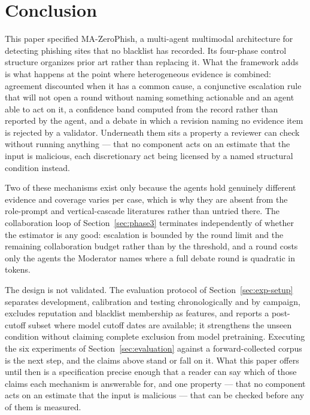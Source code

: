 \section{Conclusion}

This paper specified MA-ZeroPhish, a multi-agent multimodal architecture for
detecting phishing sites that no blacklist has recorded. Its four-phase control
structure organizes prior art rather than replacing it. What the framework adds
is what happens at the point where heterogeneous evidence is combined: agreement discounted when it
has a common cause, a conjunctive escalation rule that will not open a round
without naming something actionable and an agent able to act on it, a confidence
band computed from the record rather than reported by the agent, and a debate in
which a revision naming no evidence item is rejected by a validator. Underneath
them sits a property a reviewer can check without running anything --- that no
component acts on an estimate that the input is malicious, each discretionary
act being licensed by a named structural condition instead.

Two of these mechanisms exist only because the agents hold genuinely different
evidence and coverage varies per case, which is why they are absent from the
role-prompt and vertical-cascade literatures rather than untried there. The
collaboration loop of Section~\ref{sec:phase3} terminates independently of
whether the estimator is any good: escalation is bounded by the round limit and
the remaining collaboration budget rather than by the threshold, and a round
costs only the agents the Moderator names where a full debate round is
quadratic in tokens.

The design is not validated. The evaluation protocol of
Section~\ref{sec:exp-setup} separates development, calibration and testing
chronologically and by campaign, excludes reputation and blacklist membership
as features, and reports a post-cutoff subset where model cutoff dates are
available; it strengthens the unseen condition without claiming complete
exclusion from model pretraining. Executing the six experiments of
Section~\ref{sec:evaluation} against a forward-collected corpus is the next
step, and the claims above stand or fall on it. What this paper offers until
then is a specification precise enough that a reader can say which of those
claims each mechanism is answerable for, and one property --- that no component
acts on an estimate that the input is malicious --- that can be checked before
any of them is measured.

